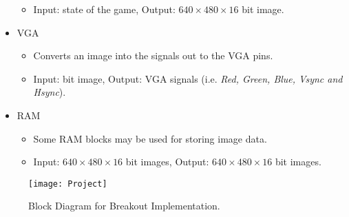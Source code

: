 \documentclass[conference]{IEEEtran}
\begin{document}
\begin{itemize}
\begin{itemize}
\item Input: state of the game, Output: $640\times 480 \times 16$ bit image.
\end{itemize}
\item VGA
\begin{itemize}
\item Converts an image into the signals out to the VGA pins.
\item Input: bit image, Output: VGA signals (i.e. \emph{Red, Green, Blue, Vsync and Hsync}).
\end{itemize}
\item RAM
\begin{itemize}
\item Some RAM blocks may be used for storing image data.
\item Input: $640\times 480 \times 16$ bit images, Output: $640\times 480 \times 16$ bit images.
\end{itemize}
\end{itemize}

\begin{figure*}[!t]
\centering
\texttt{[image: Project]}
\caption{Block Diagram for Breakout Implementation. }
\label{block}
\end{figure*}
\end{document}
